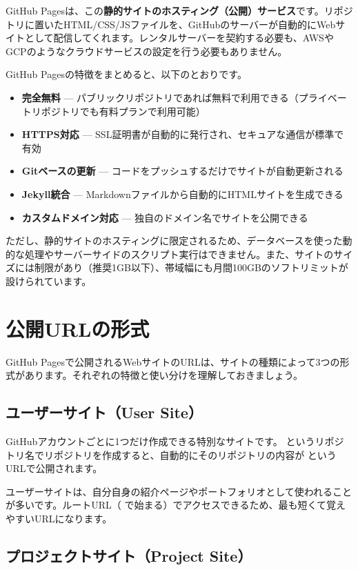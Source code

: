 GitHub Pagesは、この\textbf{静的サイトのホスティング（公開）サービス}です。リポジトリに置いたHTML/CSS/JSファイルを、GitHubのサーバーが自動的にWebサイトとして配信してくれます。レンタルサーバーを契約する必要も、AWSやGCPのようなクラウドサービスの設定を行う必要もありません。

GitHub Pagesの特徴をまとめると、以下のとおりです。

\begin{itemize}
  \item \textbf{完全無料} --- パブリックリポジトリであれば無料で利用できる（プライベートリポジトリでも有料プランで利用可能）
  \item \textbf{HTTPS対応} --- SSL証明書が自動的に発行され、セキュアな通信が標準で有効
  \item \textbf{Gitベースの更新} --- コードをプッシュするだけでサイトが自動更新される
  \item \textbf{Jekyll統合} --- Markdownファイルから自動的にHTMLサイトを生成できる
  \item \textbf{カスタムドメイン対応} --- 独自のドメイン名でサイトを公開できる
\end{itemize}

ただし、静的サイトのホスティングに限定されるため、データベースを使った動的な処理やサーバーサイドのスクリプト実行はできません。また、サイトのサイズには制限があり（推奨1GB以下）、帯域幅にも月間100GBのソフトリミットが設けられています。

\section{公開URLの形式}

GitHub Pagesで公開されるWebサイトのURLは、サイトの種類によって3つの形式があります。それぞれの特徴と使い分けを理解しておきましょう。

\subsection{ユーザーサイト（User Site）}

GitHubアカウントごとに1つだけ作成できる特別なサイトです。 というリポジトリ名でリポジトリを作成すると、自動的にそのリポジトリの内容が  というURLで公開されます。

ユーザーサイトは、自分自身の紹介ページやポートフォリオとして使われることが多いです。ルートURL（\cmd{/} で始まる）でアクセスできるため、最も短くて覚えやすいURLになります。

\subsection{プロジェクトサイト（Project Site）}

